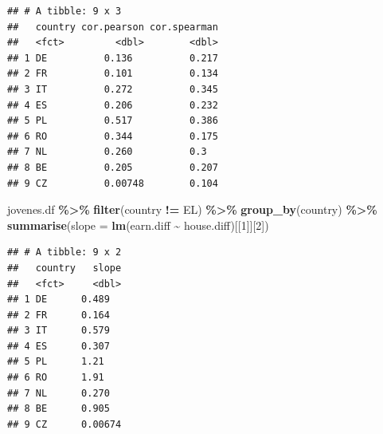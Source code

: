\documentclass[water,article,submit,pdftex,moreauthors]{Definitions/mdpi}
\newenvironment{Shaded}{\begin{snugshade}}{\end{snugshade}}
\newcommand{\AttributeTok}[1]{\textcolor[rgb]{0.13,0.29,0.53}{#1}}
\newcommand{\DecValTok}[1]{\textcolor[rgb]{0.00,0.00,0.81}{#1}}
\newcommand{\FunctionTok}[1]{\textcolor[rgb]{0.13,0.29,0.53}{\textbf{#1}}}
\newcommand{\NormalTok}[1]{#1}
\newcommand{\SpecialCharTok}[1]{\textcolor[rgb]{0.81,0.36,0.00}{\textbf{#1}}}
\newcommand{\StringTok}[1]{\textcolor[rgb]{0.31,0.60,0.02}{#1}}
\begin{document}
\begin{verbatim}
## # A tibble: 9 x 3
##   country cor.pearson cor.spearman
##   <fct>         <dbl>        <dbl>
## 1 DE          0.136          0.217
## 2 FR          0.101          0.134
## 3 IT          0.272          0.345
## 4 ES          0.206          0.232
## 5 PL          0.517          0.386
## 6 RO          0.344          0.175
## 7 NL          0.260          0.3  
## 8 BE          0.205          0.207
## 9 CZ          0.00748        0.104
\end{verbatim}

\begin{Shaded}
\begin{Highlighting}[]
\NormalTok{jovenes.df }\SpecialCharTok{\%\textgreater{}\%} \FunctionTok{filter}\NormalTok{(country }\SpecialCharTok{!=} \StringTok{\textquotesingle{}EL\textquotesingle{}}\NormalTok{) }\SpecialCharTok{\%\textgreater{}\%} \FunctionTok{group\_by}\NormalTok{(country) }\SpecialCharTok{\%\textgreater{}\%} \FunctionTok{summarise}\NormalTok{(}\AttributeTok{slope =} \FunctionTok{lm}\NormalTok{(earn.diff }\SpecialCharTok{\textasciitilde{}}\NormalTok{ house.diff)[[}\DecValTok{1}\NormalTok{]][}\DecValTok{2}\NormalTok{])}
\end{Highlighting}
\end{Shaded}

\begin{verbatim}
## # A tibble: 9 x 2
##   country   slope
##   <fct>     <dbl>
## 1 DE      0.489  
## 2 FR      0.164  
## 3 IT      0.579  
## 4 ES      0.307  
## 5 PL      1.21   
## 6 RO      1.91   
## 7 NL      0.270  
## 8 BE      0.905  
## 9 CZ      0.00674
\end{verbatim}
\end{document}
